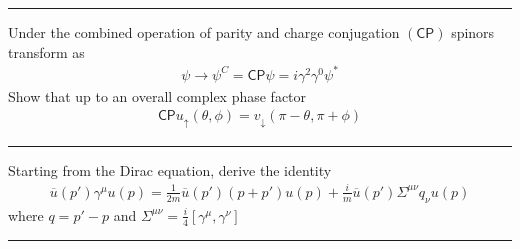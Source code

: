 \noindent\rule{7in}{1.5pt}


\begin{problem}{4.14}
Under the combined operation of parity and charge conjugation $(\mathsf{CP})$ spinors transform as
\begin{align*}
    \psi \to \psi^C = \mathsf{CP} \psi = i \gamma^2\gamma^0 \psi^\ast 
\end{align*}
Show that up to an overall complex phase factor
\begin{align*}
    \mathsf{CP} u_\uparrow \left( \theta,\phi \right) = v_\downarrow  \left( \pi-\theta,\pi+\phi \right)
\end{align*}
\end{problem}
\begin{solution}

\end{solution}

\noindent\rule{7in}{1.5pt}


\begin{problem}{4.15}
Starting from the Dirac equation, derive the identity
\begin{align*}
    \overbar{u}  (p') \gamma^\mu u ( p ) = \frac{1}{2m} \overbar{u}(p') \left(p+p'\right) u(p) + \frac{i}{m} \overbar{u}\left(p'\right) \Sigma^{\mu\nu} q_\nu u(p)
\end{align*}
where $q = p'-p$ and $\Sigma^{\mu\nu}=\frac{i}{4}\left[ \gamma^\mu,\gamma^\nu \right]$
\end{problem}
\begin{solution}

\end{solution}

\noindent\rule{7in}{1.5pt}


